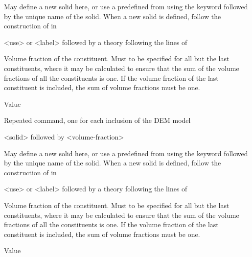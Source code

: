 {
 \slist
   \item \Description May define a new solid here, or use a predefined  from  using the keyword  followed by the unique name of the solid. When a new solid is defined, follow the construction of  in 
   \item \Argument <use> or <label> followed by a theory following the lines of 
   \item \Default
 \elist

 \slist
   \item \Description Volume fraction of the constituent. Must to be specified for all but the last constituents, where it may be calculated to ensure that the sum of the volume fractions of all the constituents is one. If the volume fraction of the last constituent is included, the sum of volume fractions must be one.
   \item \Argument Value
   \item \Default
 \elist

 \slist
   \item \Description Repeated command, one for each inclusion of the DEM model
   \item \Argument <solid> followed by <volume-fraction>
   \item \Default
 \elist

 \slist
   \item \Description May define a new solid here, or use a predefined  from  using the keyword  followed by the unique name of the solid. When a new solid is defined, follow the construction of  in 
   \item \Argument <use> or <label> followed by a theory following the lines of 
   \item \Default
 \elist

 \slist
   \item \Description Volume fraction of the constituent. Must to be specified for all but the last constituents, where it may be calculated to ensure that the sum of the volume fractions of all the constituents is one. If the volume fraction of the last constituent is included, the sum of volume fractions must be one.
   \item \Argument Value
   \item \Default
 \elist

}
